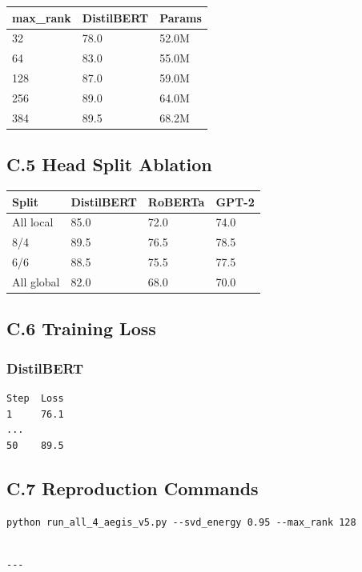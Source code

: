 \begin{table}[H]
\centering
\small
\begin{tabular}{lll}
\toprule
\textbf{max\_rank} & \textbf{DistilBERT} & \textbf{Params} \\
\midrule
32 & 78.0 & 52.0M \\
64 & 83.0 & 55.0M \\
128 & 87.0 & 59.0M \\
256 & 89.0 & 64.0M \\
384 & 89.5 & 68.2M \\
\bottomrule
\end{tabular}
\end{table}

\subsection{C.5 Head Split Ablation}

\begin{table}[H]
\centering
\small
\begin{tabular}{llll}
\toprule
\textbf{Split} & \textbf{DistilBERT} & \textbf{RoBERTa} & \textbf{GPT-2} \\
\midrule
All local & 85.0 & 72.0 & 74.0 \\
8/4 & 89.5 & 76.5 & 78.5 \\
6/6 & 88.5 & 75.5 & 77.5 \\
All global & 82.0 & 68.0 & 70.0 \\
\bottomrule
\end{tabular}
\end{table}

\subsection{C.6 Training Loss}

\subsubsection{DistilBERT}
\begin{lstlisting}
Step  Loss
1     76.1
...
50    89.5
\end{lstlisting}

\subsection{C.7 Reproduction Commands}

\begin{lstlisting}
python run_all_4_aegis_v5.py --svd_energy 0.95 --max_rank 128
\end{lstlisting}
\begin{lstlisting}

---
\end{lstlisting}


